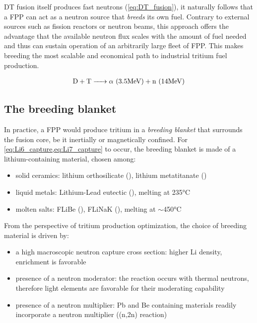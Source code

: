 \documentclass[a4paper,11pt,oneside]{report}
\begin{document}
DT fusion itself produces fast neutrons (\cref{eq:DT_fusion}), it naturally follows that a FPP can act as a neutron source that \textit{breeds} its own fuel. Contrary to external sources such as fission reactors or neutron beams, this approach offers the advantage that the available neutron flux scales with the amount of fuel needed and thus can sustain operation of an arbitrarily large fleet of FPP. This makes breeding the most scalable and economical path to industrial tritium fuel production. 

\begin{align}
    \ce{D + T -> \alpha}\ \mathrm{(3.5 MeV) + n \ (14 MeV)} \label{eq:DT_fusion}
\end{align}
    

\subsection{The breeding blanket}
In practice, a FPP would produce tritium in a \textit{breeding blanket} that surrounds the fusion core, be it inertially or magnetically confined. For \cref{eq:Li6_capture,eq:Li7_capture} to occur, the breeding blanket is made of a lithium-containing material, chosen among:
\begin{itemize}
    \item solid ceramics: lithium orthosilicate (), lithium metatitanate ()
    \item liquid metals: Lithium-Lead eutectic (), melting at 235°C
    \item molten salts: FLiBe (), FLiNaK (), melting at $\sim$450°C
\end{itemize}

From the perspective of tritium production optimization, the choice of breeding material is driven by: 
\begin{itemize}
    \item a high macroscopic neutron capture cross section: higher Li density,  enrichment is favorable
    \item presence of a neutron moderator: the  reaction occurs with thermal neutrons, therefore light elements are favorable for their moderating capability
    \item presence of a neutron multiplier: Pb and Be containing materials readily incorporate a neutron multiplier ((n,2n) reaction)
\end{itemize}
\end{document}
